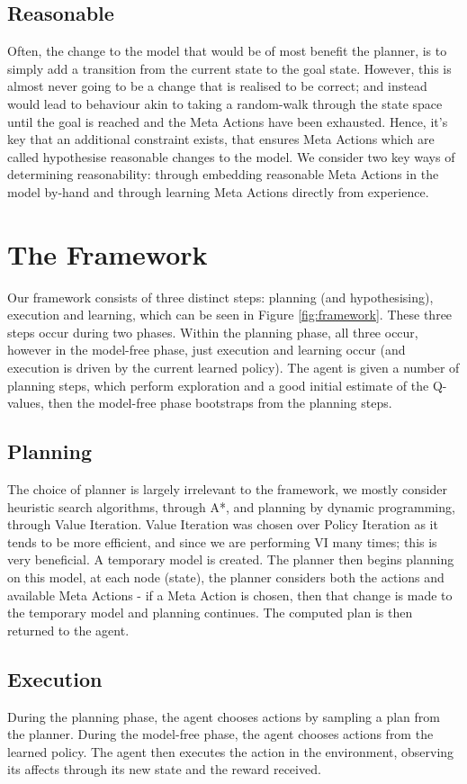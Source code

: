 \subsection{Reasonable}
Often, the change to the model that would be of most benefit the planner, is to simply add a transition from the current state to the goal state. However, this is almost never going to be a change that is realised to be correct; and instead would lead to behaviour akin to taking a random-walk through the state space until the goal is reached and the Meta Actions have been exhausted. Hence, it's key that an additional constraint exists, that ensures Meta Actions which are called hypothesise reasonable changes to the model. We consider two key ways of determining reasonability: through embedding reasonable Meta Actions in the model by-hand and through learning Meta Actions directly from experience.

\section{The Framework}
Our framework consists of three distinct steps: planning (and hypothesising), execution and learning, which can be seen in Figure \ref{fig:framework}. These three steps occur during two phases. Within the planning phase, all three occur, however in the model-free phase, just execution and learning occur (and execution is driven by the current learned policy). The agent is given a number of planning steps, which perform exploration and a good initial estimate of the Q-values, then the model-free phase bootstraps from the planning steps.

\subsection{Planning}
The choice of planner is largely irrelevant to the framework, we mostly consider heuristic search algorithms, through A*, and planning by dynamic programming, through Value Iteration. Value Iteration was chosen over Policy Iteration as it tends to be more efficient, and since we are performing VI many times; this is very beneficial. 
A temporary model is created. The planner then begins planning on this model, at each node (state), the planner considers both the actions and available Meta Actions - if a Meta Action is chosen, then that change is made to the temporary model and planning continues. The computed plan is then returned to the agent.
\subsection{Execution}
During the planning phase, the agent chooses actions by sampling a plan from the planner. During the model-free phase, the agent chooses actions from the learned policy. The agent then executes the action in the environment, observing its affects through its new state and the reward received.
